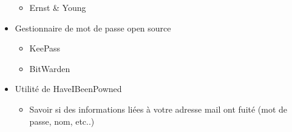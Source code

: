 \documentclass[a4paper]{article}
\begin{document}
\begin{itemize}[label=\textbullet, font=\Large]
\begin{itemize}[label=, font=\scriptsize]
    \item Ernst \& Young
  \end{itemize}
  \item Gestionnaire de mot de passe open source
  \begin{itemize}[label=, font=\scriptsize]
    \item KeePass
    \item BitWarden
  \end{itemize}
  \item Utilité de HaveIBeenPowned
  \begin{itemize}[label=, font=\scriptsize]
    \item Savoir si des informations liées à votre adresse mail ont fuité (mot de passe, nom, etc..)
  \end{itemize}
\end{itemize}
\end{document}
